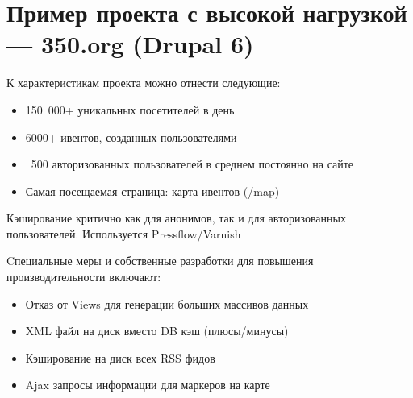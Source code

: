 \documentclass[10pt, a5paper]{article}
\begin{document}
\section*{Пример проекта с высокой нагрузкой --- 350.org (Drupal 6)}

К характеристикам проекта можно отнести следующие: 
\begin{itemize}
	\item 150 000+  уникальных посетителей в день
	\item 6000+ ивентов, созданных пользователями
	\item ~500 авторизованных пользователей в среднем постоянно на сайте
	\item Самая посещаемая страница: карта ивентов (/map)
\end{itemize}

Кэширование критично как для анонимов, так и для авторизованных пользователей. Используется Pressflow/Varnish

Cпециальные меры и собственные разработки для повышения производительности включают:
\begin{itemize}
	\item Отказ от Views для генерации больших массивов данных
	\item  XML файл на диск вместо DB кэш (плюсы/минусы)
	\item Кэширование на диск всех RSS фидов
	\item Ajax запросы информации для маркеров на карте
\end{itemize}
\end{document}
